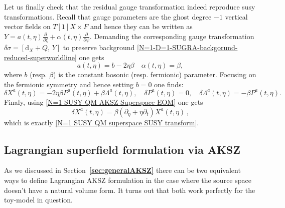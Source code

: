\documentclass[a4paper,12pt]{article}
\numberwithin{equation}{section} %
\newcommand{\bref}[1]{\textbf{\ref{#1}}}
\newcommand{\dx}{\mathrm{d}_X}
\newcommand{\commut}[2]{[#1{,}\,#2]}
\numberwithin{equation}{section}
\newcommand{\stheta}{\eta}
\begin{document}
Let us finally check that the residual gauge transformation indeed reproduce susy transformations. Recall that gauge parameters are the ghost degree $-1$ vertical vector fields on $T[1]X\times F$ and hence they can be written as $Y = a(t,\stheta)\frac{\partial}{\partial \xi}+\alpha(t,\stheta)\frac{\partial}{\partial\psi}$. Demanding the corresponding gauge transformation $\delta\sigma=\commut{\dx+Q}{Y}$ to preserve background \eqref{N=1-D=1-SUGRA-backgorund-reduced-superworldline} one gets
\begin{equation}
    a(t,\stheta) = b -2 \stheta\beta \quad \alpha(t,\stheta) = \beta,
\end{equation}
where $b$ (resp. $\beta$) is the constant bosonic (resp. fermionic) parameter. Focusing on the fermionic symmetry and hence setting $b=0$ one finds:
\begin{equation}
    \delta X^a(t,\stheta) = -2\stheta\beta P^a(t,\stheta) +\beta \Lambda^a(t,\stheta), \quad \delta P^a(t,\stheta)=0, \quad \delta \Lambda^a(t,\stheta) = - \beta P^a(t,\stheta).
\end{equation}
Finaly, using \eqref{N=1 SUSY QM AKSZ Superspace EOM} one gets
\begin{equation}
    \delta X^a(t,\stheta) = \beta (\partial_\stheta + \stheta\partial_t) X^a(t,\stheta)\,,
\end{equation}
which is exactly \eqref{N=1 SUSY QM superspace SUSY transform}.



\subsection{Lagrangian superfield formulation via AKSZ}

As we discussed in Section~\bref{sec:generalAKSZ} there can be two equivalent ways to define Lagrangian AKSZ formulation in the case where the source space doesn't have a natural volume form. It turns out that both work perfectly for the toy-model in question.
\end{document}

